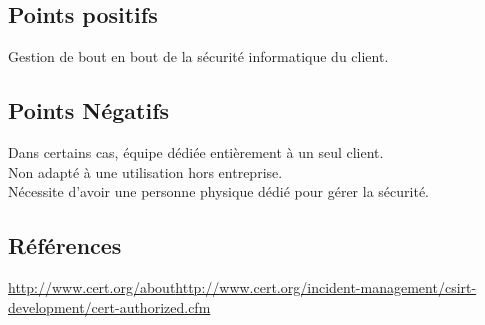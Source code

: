 \subsection{Points positifs}
Gestion de bout en bout de la sécurité informatique du client.

\subsection{Points Négatifs}
Dans certains cas, équipe dédiée entièrement à un seul client.\\
Non adapté à une utilisation hors entreprise.\\
Nécessite d’avoir une personne physique dédié pour gérer la sécurité.\\

\subsection{Références}
\small
\noindent
[1][2] \url{http://www.cert.org/about}\newline
[3][4] \url{http://www.cert.org/incident-management/csirt-development/cert-authorized.cfm}\newline
\normalsize